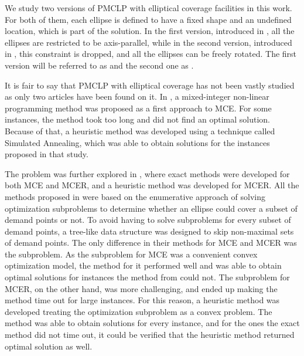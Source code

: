 We study two versions of PMCLP with elliptical coverage facilities in this work. For both of them, each ellipse is defined to have a fixed shape and an undefined location, which is part of the solution.
In the first version, introduced in \cite{canbolat}, all the ellipses are restricted to be axis-parallel, while in the second version, introduced in \cite{andreta}, this constraint is dropped, and all the ellipses can be freely rotated.
The first version will be referred to as  and the second one as  .

It is fair to say that PMCLP with elliptical coverage has not been vastly studied as only two articles have been found on it. In , a mixed-integer non-linear programming method was proposed as a first approach to MCE. For some instances, the method took too long and did not find an optimal solution.
Because of that, a heuristic method was developed using a technique called Simulated Annealing, which was able to obtain solutions for the instances proposed in that study.

The problem was further explored in , where exact methods were developed for both MCE and MCER, and a heuristic method was developed for MCER.
All the methods proposed in \cite{andreta} were based on the enumerative approach of solving optimization subproblems to determine whether an ellipse could cover a subset of demand points or not. To avoid having to solve subproblems for every subset of demand points, a tree-like data structure was designed to skip non-maximal sets of demand points.
The only difference in their methods for MCE and MCER was the subproblem.
As the subproblem for MCE was a convenient convex optimization model, the method for it performed well and  was able to obtain optimal solutions for instances the method from \cite{canbolat} could not.
The subproblem for MCER, on the other hand, was more challenging, and ended up making the method time out for large instances. For this reason, a heuristic method was developed treating the optimization subproblem as a convex problem. The method was able to obtain solutions for every instance, and for the ones the exact method did not time out, it could be verified that the heuristic method returned optimal solution as well.


